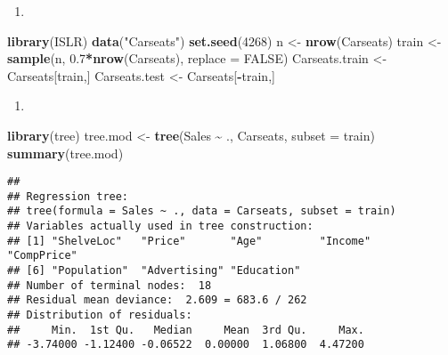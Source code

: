 \documentclass[
]{article}
\newenvironment{Shaded}{\begin{snugshade}}{\end{snugshade}}
\newcommand{\AttributeTok}[1]{\textcolor[rgb]{0.13,0.29,0.53}{#1}}
\newcommand{\ConstantTok}[1]{\textcolor[rgb]{0.56,0.35,0.01}{#1}}
\newcommand{\DecValTok}[1]{\textcolor[rgb]{0.00,0.00,0.81}{#1}}
\newcommand{\FloatTok}[1]{\textcolor[rgb]{0.00,0.00,0.81}{#1}}
\newcommand{\FunctionTok}[1]{\textcolor[rgb]{0.13,0.29,0.53}{\textbf{#1}}}
\newcommand{\NormalTok}[1]{#1}
\newcommand{\OtherTok}[1]{\textcolor[rgb]{0.56,0.35,0.01}{#1}}
\newcommand{\SpecialCharTok}[1]{\textcolor[rgb]{0.81,0.36,0.00}{\textbf{#1}}}
\newcommand{\StringTok}[1]{\textcolor[rgb]{0.31,0.60,0.02}{#1}}
\providecommand{\tightlist}{%
  \setlength{\itemsep}{0pt}\setlength{\parskip}{0pt}}
\begin{document}
\begin{enumerate}
\def\labelenumi{\alph{enumi})}
\tightlist
\item
\end{enumerate}

\begin{Shaded}
\begin{Highlighting}[]
\FunctionTok{library}\NormalTok{(ISLR)}
\FunctionTok{data}\NormalTok{(}\StringTok{"Carseats"}\NormalTok{)}
\FunctionTok{set.seed}\NormalTok{(}\DecValTok{4268}\NormalTok{)}
\NormalTok{n }\OtherTok{\textless{}{-}} \FunctionTok{nrow}\NormalTok{(Carseats)}
\NormalTok{train }\OtherTok{\textless{}{-}} \FunctionTok{sample}\NormalTok{(n, }\FloatTok{0.7}\SpecialCharTok{*}\FunctionTok{nrow}\NormalTok{(Carseats), }\AttributeTok{replace =} \ConstantTok{FALSE}\NormalTok{)}
\NormalTok{Carseats.train }\OtherTok{\textless{}{-}}\NormalTok{ Carseats[train,]}
\NormalTok{Carseats.test }\OtherTok{\textless{}{-}}\NormalTok{ Carseats[}\SpecialCharTok{{-}}\NormalTok{train,]}
\end{Highlighting}
\end{Shaded}

\begin{enumerate}
\def\labelenumi{\alph{enumi})}
\setcounter{enumi}{1}
\tightlist
\item
\end{enumerate}

\begin{Shaded}
\begin{Highlighting}[]
\FunctionTok{library}\NormalTok{(tree)}
\NormalTok{tree.mod }\OtherTok{\textless{}{-}} \FunctionTok{tree}\NormalTok{(Sales }\SpecialCharTok{\textasciitilde{}}\NormalTok{ ., Carseats, }\AttributeTok{subset =}\NormalTok{ train)}
\FunctionTok{summary}\NormalTok{(tree.mod)}
\end{Highlighting}
\end{Shaded}

\begin{verbatim}
## 
## Regression tree:
## tree(formula = Sales ~ ., data = Carseats, subset = train)
## Variables actually used in tree construction:
## [1] "ShelveLoc"   "Price"       "Age"         "Income"      "CompPrice"  
## [6] "Population"  "Advertising" "Education"  
## Number of terminal nodes:  18 
## Residual mean deviance:  2.609 = 683.6 / 262 
## Distribution of residuals:
##     Min.  1st Qu.   Median     Mean  3rd Qu.     Max. 
## -3.74000 -1.12400 -0.06522  0.00000  1.06800  4.47200
\end{verbatim}
\end{document}
